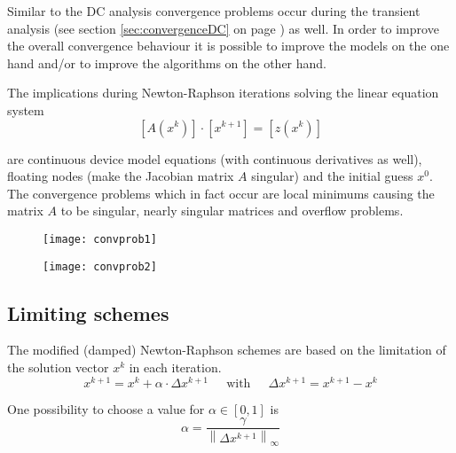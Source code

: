 Similar to the DC analysis convergence problems occur during the
transient analysis (see section \ref{sec:convergenceDC} on page
\pageref{sec:convergenceDC}) as well.  In order to improve the overall
convergence behaviour it is possible to improve the models on the one
hand and/or to improve the algorithms on the other hand.

\addvspace{12pt}

The implications during Newton-Raphson iterations solving the linear
equation system
\begin{equation}
\left[A\left(x^k\right)\right] \cdot \left[x^{k+1}\right] = \left[z\left(x^k\right)\right]
\end{equation}

are continuous device model equations (with continuous derivatives as
well), floating nodes (make the Jacobian matrix $A$ singular) and the
initial guess $x^0$.  The convergence problems which in fact occur are
local minimums causing the matrix $A$ to be singular, nearly singular
matrices and overflow problems.

\begin{figure}[ht]
\begin{center}
\texttt{[image: convprob1]}
\end{center}
\label{fig:ConvProb1}
\end{figure}
\FloatBarrier

\begin{figure}[ht]
\begin{center}
\texttt{[image: convprob2]}
\end{center}
\label{fig:ConvProb2}
\end{figure}
\FloatBarrier

\subsection{Limiting schemes}

The modified (damped) Newton-Raphson schemes are based on the
limitation of the solution vector $x^k$ in each iteration.
\begin{equation}
x^{k+1} = x^k + \alpha\cdot \Delta x^{k+1}
\;\;\;\; \textrm{ with } \;\;\;\;
\Delta x^{k+1} = x^{k+1} - x^k
\end{equation}

One possibility to choose a value for $\alpha \in [0,1]$ is
\begin{equation}
\alpha = \dfrac{\gamma}{\left\lVert\Delta x^{k+1}\right\rVert_{\infty}}
\end{equation}

